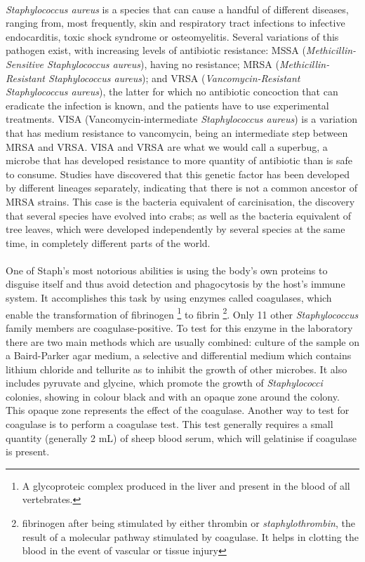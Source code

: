 \paragraph{}\emph{Staphylococcus aureus} is a species that can cause a handful of different diseases, ranging from, most frequently, skin and respiratory tract infections to infective endocarditis, toxic shock syndrome or osteomyelitis. Several variations of this pathogen exist, with increasing levels of antibiotic resistance: MSSA (\emph{Methicillin-Sensitive Staphylococcus aureus}), having no resistance; MRSA (\emph{Methicillin-Resistant Staphylococcus aureus}); and VRSA (\emph{Vancomycin-Resistant \emph{Staphylococcus aureus}}), the   latter for which no antibiotic concoction that can eradicate the infection is known, and the patients have to use experimental treatments. VISA (Vancomycin-intermediate \emph{Staphylococcus aureus}) is a variation that has medium resistance to vancomycin, being an intermediate step between MRSA and VRSA. VISA and VRSA are what we would call a superbug, a microbe that has developed resistance to more quantity of antibiotic than is safe to consume. Studies have discovered that this genetic factor has been developed by different lineages separately, indicating that there is not a common ancestor of MRSA strains. This case is the bacteria equivalent of carcinisation, the discovery that several species have evolved into crabs; as well as the bacteria equivalent of tree leaves, which were developed independently by several species at the same time, in completely different parts of the world. 
\paragraph{}One of Staph's most notorious abilities is using the body's own proteins to disguise itself and thus avoid detection and phagocytosis by the host's immune system. It accomplishes this task by using enzymes called coagulases, which enable the transformation of fibrinogen \footnote{A glycoproteic complex produced in the liver and present in the blood of all vertebrates.} to fibrin \footnote{fibrinogen after being stimulated by either thrombin or \emph{staphylothrombin}, the result of a molecular pathway stimulated by coagulase. It helps in clotting the blood in the event of vascular or tissue injury}\cite{murrayMicrobiologiaMedica2013}. Only 11 other \emph{Staphylococcus} family members are coagulase-positive. To test for this enzyme in the laboratory there are two main methods which are usually combined: culture of the sample on a Baird-Parker agar medium, a selective and differential medium which contains lithium chloride and tellurite as to inhibit the growth of other microbes. It also includes pyruvate and glycine, which promote the growth of \emph{Staphylococci} colonies, showing in colour black and with an opaque zone around the colony. This opaque zone represents the effect of the coagulase. Another way to test for coagulase is to perform a coagulase test. This test generally requires a small quantity (generally 2 mL) of sheep blood serum, which will gelatinise if coagulase is present.
